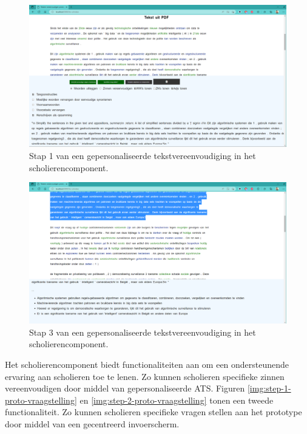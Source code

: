 \begin{center}
	\begin{figure}[H]
		\includegraphics[width=\linewidth]{img/proto-opsomming-1.png}
		\caption{Stap 1 van een gepersonaliseerde tekstvereenvoudiging in het scholierencomponent.}
		\label{img:proto-scholieren-step-1}
	\end{figure}
\end{center}

\begin{center}
	\begin{figure}[H]
		\includegraphics[width=\linewidth]{img/proto-opsomming-3.png}
		\caption{Stap 3 van een gepersonaliseerde tekstvereenvoudiging in het scholierencomponent.}
		\label{img:proto-scholieren-step-3}
	\end{figure}
\end{center}

Het scholierencomponent biedt functionaliteiten aan om een ondersteunende ervaring aan scholieren toe te lenen. Zo kunnen scholieren specifieke zinnen vereenvoudigen door middel van gepersonaliseerde ATS. Figuren \ref{img:step-1-proto-vraagstelling} en \ref{img:step-2-proto-vraagstelling} tonen een tweede functionaliteit. Zo kunnen scholieren specifieke vragen stellen aan het prototype door middel van een gecentreerd invoerscherm.

